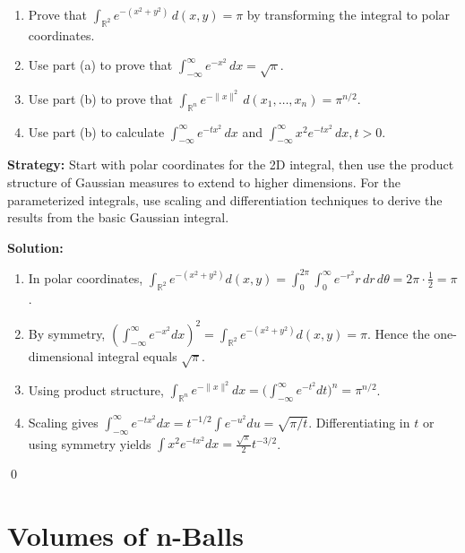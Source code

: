 \begin{problembox}
\begin{problemstatement}
\begin{enumerate}[label=(\alph*)]
\item Prove that \(\int_{\mathbb{R}^2} e^{-(x^2 + y^2)} \, d(x, y) = \pi\) by transforming the integral to polar coordinates.
\item Use part (a) to prove that \(\int_{-\infty}^{\infty} e^{-x^2} \, dx = \sqrt{\pi}\).
\item Use part (b) to prove that \(\int_{\mathbb{R}^n} e^{-\|x\|^2} \, d(x_1, \ldots, x_n) = \pi^{n/2}\).
\item Use part (b) to calculate \(\int_{-\infty}^{\infty} e^{-tx^2} \, dx\) and \(\int_{-\infty}^{\infty} x^2 e^{-tx^2} \, dx, t > 0\).
\end{enumerate}
\end{problemstatement}
\end{problembox}

\noindent\textbf{Strategy:} Start with polar coordinates for the 2D integral, then use the product structure of Gaussian measures to extend to higher dimensions. For the parameterized integrals, use scaling and differentiation techniques to derive the results from the basic Gaussian integral.

\bigskip\noindent\textbf{Solution:}
\begin{enumerate}[label=(\alph*)]
\item In polar coordinates,
\(\int_{\mathbb{R}^2} e^{-(x^2+y^2)} d(x,y)=\int_0^{2\pi}\int_0^{\infty} e^{-r^2} r\,dr\,d\theta=2\pi\cdot\tfrac12=\pi\).
\item By symmetry, \(\left(\int_{-\infty}^{\infty} e^{-x^2}dx\right)^2=\int_{\mathbb{R}^2} e^{-(x^2+y^2)}d(x,y)=\pi\). Hence the one-dimensional integral equals \(\sqrt{\pi}\).
\item Using product structure, \(\int_{\mathbb{R}^n} e^{-\|x\|^2}dx=\big(\int_{-\infty}^{\infty} e^{-t^2}dt\big)^n=\pi^{n/2}\).
\item Scaling gives \(\int_{-\infty}^{\infty} e^{-t x^2} dx = t^{-1/2}\int e^{-u^2}du = \sqrt{\pi/t}\). Differentiating in \(t\) or using symmetry yields \(\int x^2 e^{-t x^2} dx = \tfrac{\sqrt{\pi}}{2} t^{-3/2}\).
\end{enumerate}\qed
\section{Volumes of n-Balls}

